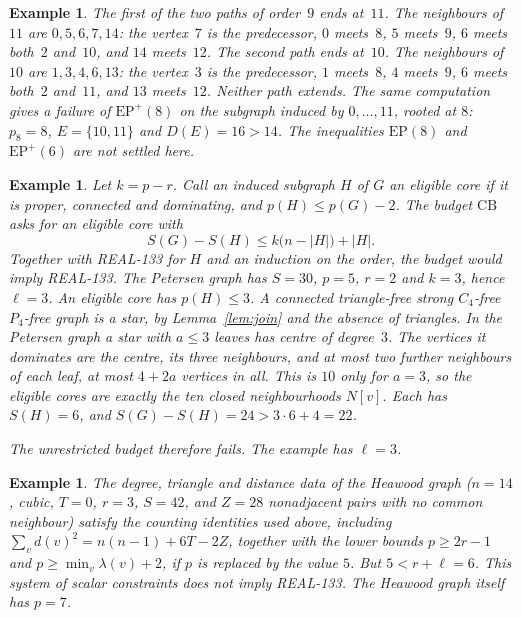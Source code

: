 \documentclass[ASNA]{USG}
\theoremstyle{WBstyletwo}
\newtheorem{example}[theorem]{Example}
\numberwithin{equation}{section}
\newcommand{\lr}{\ell}
\newcommand{\pp}{p}
\begin{document}
\begin{example}
The first of the two paths of order~$9$ ends at~$11$. The neighbours of~$11$ are $0,5,6,7,14$: the vertex~$7$ is the predecessor, $0$ meets~$8$, $5$ meets~$9$, $6$ meets both~$2$ and~$10$, and $14$ meets~$12$. The second path ends at~$10$. The neighbours of~$10$ are $1,3,4,6,13$: the vertex~$3$ is the predecessor, $1$ meets~$8$, $4$ meets~$9$, $6$ meets both~$2$ and~$11$, and $13$ meets~$12$. Neither path extends. The same computation gives a failure of $\mathrm{EP}^+(8)$ on the subgraph induced by $0,\dots,11$, rooted at $8$: $\pp_8=8$, $E=\{10,11\}$ and $D(E)=16>14$. The inequalities $\mathrm{EP}(8)$ and $\mathrm{EP}^+(6)$ are not settled here.
\end{example}

\begin{example}\label{ex:cb}
Let $k=\pp-r$. Call an induced subgraph $H$ of $G$ an \emph{eligible core} if it is proper, connected and dominating, and $\pp(H)\le\pp(G)-2$. The budget $\mathrm{CB}$ asks for an eligible core with
\[
S(G)-S(H)\le k\bigl(n-|H|\bigr)+|H|.
\]
Together with REAL-133 for $H$ and an induction on the order, the budget would imply REAL-133. The Petersen graph has $S=30$, $\pp=5$, $r=2$ and $k=3$, hence $\lr=3$. An eligible core has $\pp(H)\le 3$. A connected triangle-free strong $C_4$-free $P_4$-free graph is a star, by Lemma~\ref{lem:join} and the absence of triangles. In the Petersen graph a star with $a\le 3$ leaves has centre of degree~$3$. The vertices it dominates are the centre, its three neighbours, and at most two further neighbours of each leaf, at most $4+2a$ vertices in all. This is $10$ only for $a=3$, so the eligible cores are exactly the ten closed neighbourhoods $N[v]$. Each has $S(H)=6$, and $S(G)-S(H)=24>3\cdot 6+4=22$.

The unrestricted budget therefore fails. The example has $\lr=3$.
\end{example}

\begin{example}\label{ex:heawood}
The degree, triangle and distance data of the Heawood graph ($n=14$, cubic, $T=0$, $r=3$, $S=42$, and $Z=28$ nonadjacent pairs with no common neighbour) satisfy the counting identities used above, including $\sum_v d(v)^2=n(n-1)+6T-2Z$, together with the lower bounds $\pp\ge 2r-1$ and $\pp\ge\min_v\lambda(v)+2$, if $\pp$ is replaced by the value $5$. But $5<r+\lr=6$. This system of scalar constraints does not imply REAL-133. The Heawood graph itself has $\pp=7$.
\end{example}
\end{document}
